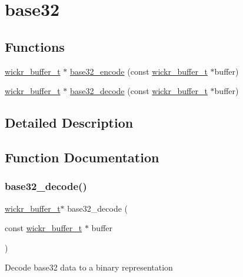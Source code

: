 \hypertarget{group__base32}{}\section{base32}
\label{group__base32}
\subsection*{Functions}
\begin{DoxyCompactItemize}
\item 
\mbox{\hyperlink{structwickr__buffer}{wickr\+\_\+buffer\+\_\+t}} $\ast$ \mbox{\hyperlink{group__base32_ga343c12edab05fb3b98a18474e20487c6}{base32\+\_\+encode}} (const \mbox{\hyperlink{structwickr__buffer}{wickr\+\_\+buffer\+\_\+t}} $\ast$buffer)
\item 
\mbox{\hyperlink{structwickr__buffer}{wickr\+\_\+buffer\+\_\+t}} $\ast$ \mbox{\hyperlink{group__base32_ga2ef9e4c1b2b030599d1e3199254af7c3}{base32\+\_\+decode}} (const \mbox{\hyperlink{structwickr__buffer}{wickr\+\_\+buffer\+\_\+t}} $\ast$buffer)
\end{DoxyCompactItemize}


\subsection{Detailed Description}


\subsection{Function Documentation}
\mbox{\label{group__base32_ga2ef9e4c1b2b030599d1e3199254af7c3}} 
\subsubsection{\texorpdfstring{base32\+\_\+decode()}{base32\_decode()}}
{\footnotesize\ttfamily \mbox{\hyperlink{structwickr__buffer}{wickr\+\_\+buffer\+\_\+t}}$\ast$ base32\+\_\+decode (\begin{DoxyParamCaption}\item[{const \mbox{\hyperlink{structwickr__buffer}{wickr\+\_\+buffer\+\_\+t}} $\ast$}]{buffer }\end{DoxyParamCaption})}

Decode base32 data to a binary representation


